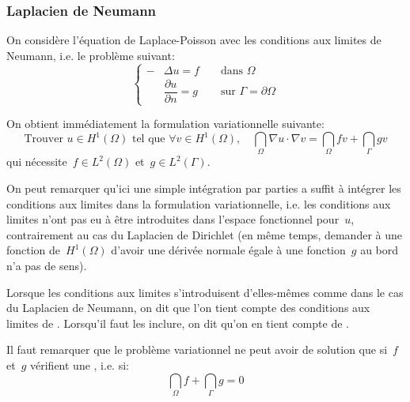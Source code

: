 \medskip
\subsubsection{Laplacien de Neumann}
On considère l'équation de Laplace-Poisson avec les conditions aux limites de Neumann, i.e. le problème suivant:
\begin{equation}\left\{\begin{aligned}
-&\Delta u=f &&\text{ dans } \Omega\\
&\dfrac{\partial u}{\partial n}=g &&\text{ sur } \Gamma=\partial\Omega
\end{aligned}
\right.
\end{equation}

\medskip
On obtient immédiatement la formulation variationnelle suivante:
\begin{equation}
\text{Trouver } u \in H^1(\Omega) \text{ tel que }
\forall v\in H^1(\Omega),\quad \dint_\Omega \nabla u\cdot\nabla v = \dint_\Omega fv + \dint_\Gamma gv
\end{equation}
qui nécessite~$f\in L^2(\Omega)$ et~$g\in L^2(\Gamma)$.

\medskip
On peut remarquer qu'ici une simple intégration par parties a suffit à intégrer les conditions aux limites dans la formulation variationnelle, i.e. les conditions aux limites n'ont pas eu à être introduites dans l'espace fonctionnel pour~$u$, contrairement au cas du Laplacien de Dirichlet (en même temps, demander à une fonction de~$H^1(\Omega)$ d'avoir une dérivée normale égale à une fonction~$g$ au bord n'a pas de sens).

Lorsque les conditions aux limites s'introduisent d'elles-mêmes comme dans le cas du Laplacien de Neumann, on dit que l'on tient compte des conditions aux limites de . Lorsqu'il faut les inclure, on dit qu'on en tient compte de .

\medskip
Il faut remarquer que le problème variationnel ne peut avoir de solution que si~$f$ et~$g$ vérifient une , i.e. si:
\begin{equation}
\dint_\Omega f + \dint_\Gamma g = 0
\end{equation}

